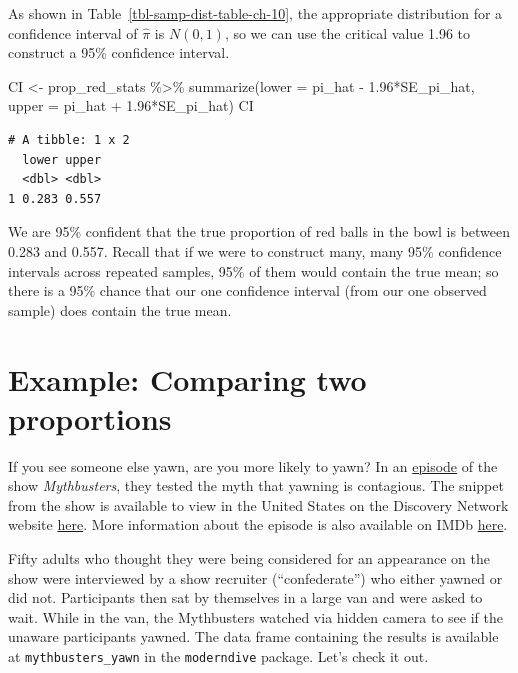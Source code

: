 \documentclass[
  letterpaper,
  DIV=11,
  numbers=noendperiod]{scrreprt}
\newenvironment{Shaded}{\begin{snugshade}}{\end{snugshade}}
\newcommand{\AttributeTok}[1]{\textcolor[rgb]{0.40,0.45,0.13}{#1}}
\newcommand{\FloatTok}[1]{\textcolor[rgb]{0.68,0.00,0.00}{#1}}
\newcommand{\FunctionTok}[1]{\textcolor[rgb]{0.28,0.35,0.67}{#1}}
\newcommand{\NormalTok}[1]{\textcolor[rgb]{0.00,0.23,0.31}{#1}}
\newcommand{\OtherTok}[1]{\textcolor[rgb]{0.00,0.23,0.31}{#1}}
\newcommand{\SpecialCharTok}[1]{\textcolor[rgb]{0.37,0.37,0.37}{#1}}
\theoremstyle{definition}
\theoremstyle{remark}
\begin{document}
As shown in Table~\ref{tbl-samp-dist-table-ch-10}, the appropriate
distribution for a confidence interval of \(\hat{\pi}\) is \(N(0,1)\),
so we can use the critical value 1.96 to construct a 95\% confidence
interval.

\begin{Shaded}
\begin{Highlighting}[]
\NormalTok{CI }\OtherTok{\textless{}{-}}\NormalTok{ prop\_red\_stats }\SpecialCharTok{\%\textgreater{}\%} 
  \FunctionTok{summarize}\NormalTok{(}\AttributeTok{lower =}\NormalTok{ pi\_hat }\SpecialCharTok{{-}} \FloatTok{1.96}\SpecialCharTok{*}\NormalTok{SE\_pi\_hat,}
            \AttributeTok{upper =}\NormalTok{ pi\_hat }\SpecialCharTok{+} \FloatTok{1.96}\SpecialCharTok{*}\NormalTok{SE\_pi\_hat)}
\NormalTok{CI}
\end{Highlighting}
\end{Shaded}

\begin{verbatim}
# A tibble: 1 x 2
  lower upper
  <dbl> <dbl>
1 0.283 0.557
\end{verbatim}

We are 95\% confident that the true proportion of red balls in the bowl
is between 0.283 and 0.557. Recall that if we were to construct many,
many 95\% confidence intervals across repeated samples, 95\% of them
would contain the true mean; so there is a 95\% chance that our one
confidence interval (from our one observed sample) does contain the true
mean.

\hypertarget{example-comparing-two-proportions}{%
\section{Example: Comparing two
proportions}\label{example-comparing-two-proportions}}

If you see someone else yawn, are you more likely to yawn? In an
\href{http://www.discovery.com/tv-shows/mythbusters/mythbusters-database/yawning-contagious/}{episode}
of the show \emph{Mythbusters}, they tested the myth that yawning is
contagious. The snippet from the show is available to view in the United
States on the Discovery Network website
\href{https://www.discovery.com/tv-shows/mythbusters/videos/is-yawning-contagious}{here}.
More information about the episode is also available on IMDb
\href{https://www.imdb.com/title/tt0768479/}{here}.

Fifty adults who thought they were being considered for an appearance on
the show were interviewed by a show recruiter (``confederate'') who
either yawned or did not. Participants then sat by themselves in a large
van and were asked to wait. While in the van, the Mythbusters watched
via hidden camera to see if the unaware participants yawned. The data
frame containing the results is available at \texttt{mythbusters\_yawn}
in the \texttt{moderndive} package. Let's check it out.
\end{document}
